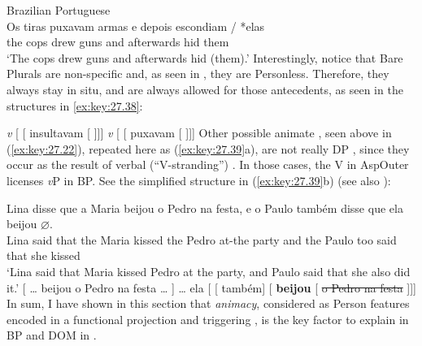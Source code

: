 \documentclass[output=paper]{langsci/langscibook}
\begin{document}
\ea\label{ex:key:27.37} Brazilian Portuguese\\
    \gll Os   tiras    puxavam \ob{} armas \cb{} e depois escondiam \underline{\hphantom{elas}} / *elas\\
        the   cops   drew       {} guns {}       and   afterwards hid {} {} \hphantom{*}them\\
    \glt `The cops drew guns and afterwards hid (them).'
\z
Interestingly, notice that Bare Plurals are non-specific and, as seen in
, they are Personless. Therefore, they always stay in situ,
and  are always allowed for those antecedents, as seen in the
structures in \eqref{ex:key:27.38}:

\ea\label{ex:key:27.38}
    \ea \emph{v} [ [ insultavam [
      ]]]
        \vspace{2em}
    \ex \emph{v} [ [ puxavam [
      ]]]
        \vspace{2em}
    \z
\z
Other possible animate , seen above in (\ref{ex:key:27.22}),
repeated here as (\ref{ex:key:27.39}a), are not really DP , since they
occur as the result of verbal (\enquote{V-stranding}) . In those cases,
the V in AspOuter licenses \emph{v}P  in BP\@. See the simplified
structure in (\ref{ex:key:27.39}b) (see also
\citealt{Cyrino2013,ReintgesCyrino2016}):


\ea\label{ex:key:27.39} 
    \ea
        \gll    Lina disse  que   a   Maria beijou   o Pedro na festa, e o Paulo também disse que ela  beijou \textbf{$\varnothing$}.\\
                Lina said    that the Maria kissed   the   Pedro   at-the   party and  the Paulo too       said   that  she kissed\\
        \glt    `Lina said that Maria kissed Pedro at the party, and Paulo said that she also did it.'
    \ex
        {}[ \dots{} beijou o Pedro na festa \dots{} ] \dots{} ela [ [ também] [\textbf{} \textbf{beijou} [ \sout{o Pedro na festa} ]]]\\
    \z
\z
In sum, I have shown in this section that \emph{animacy}, considered as Person
features encoded in a functional projection and triggering , is the key
factor to explain  in \gls{BP} and
DOM in .
\end{document}
